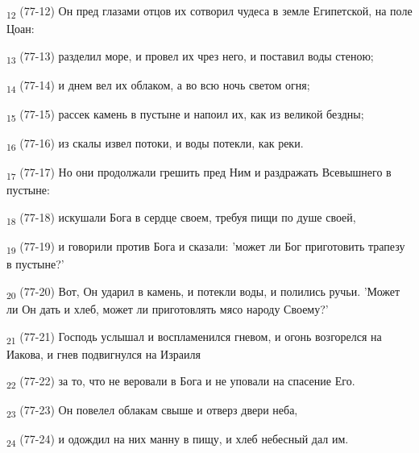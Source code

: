 \begin{tcolorbox}
\textsubscript{12} (77-12) Он пред глазами отцов их сотворил чудеса в земле Египетской, на поле Цоан:
\end{tcolorbox}
\begin{tcolorbox}
\textsubscript{13} (77-13) разделил море, и провел их чрез него, и поставил воды стеною;
\end{tcolorbox}
\begin{tcolorbox}
\textsubscript{14} (77-14) и днем вел их облаком, а во всю ночь светом огня;
\end{tcolorbox}
\begin{tcolorbox}
\textsubscript{15} (77-15) рассек камень в пустыне и напоил их, как из великой бездны;
\end{tcolorbox}
\begin{tcolorbox}
\textsubscript{16} (77-16) из скалы извел потоки, и воды потекли, как реки.
\end{tcolorbox}
\begin{tcolorbox}
\textsubscript{17} (77-17) Но они продолжали грешить пред Ним и раздражать Всевышнего в пустыне:
\end{tcolorbox}
\begin{tcolorbox}
\textsubscript{18} (77-18) искушали Бога в сердце своем, требуя пищи по душе своей,
\end{tcolorbox}
\begin{tcolorbox}
\textsubscript{19} (77-19) и говорили против Бога и сказали: 'может ли Бог приготовить трапезу в пустыне?'
\end{tcolorbox}
\begin{tcolorbox}
\textsubscript{20} (77-20) Вот, Он ударил в камень, и потекли воды, и полились ручьи. 'Может ли Он дать и хлеб, может ли приготовлять мясо народу Своему?'
\end{tcolorbox}
\begin{tcolorbox}
\textsubscript{21} (77-21) Господь услышал и воспламенился гневом, и огонь возгорелся на Иакова, и гнев подвигнулся на Израиля
\end{tcolorbox}
\begin{tcolorbox}
\textsubscript{22} (77-22) за то, что не веровали в Бога и не уповали на спасение Его.
\end{tcolorbox}
\begin{tcolorbox}
\textsubscript{23} (77-23) Он повелел облакам свыше и отверз двери неба,
\end{tcolorbox}
\begin{tcolorbox}
\textsubscript{24} (77-24) и одождил на них манну в пищу, и хлеб небесный дал им.
\end{tcolorbox}
